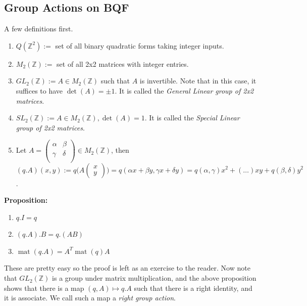 \documentclass[a4paper,11pt,abstracton]{scrartcl}
\theoremstyle{dotlessP}
\theoremstyle{dotlessS}
\theoremstyle{remark}
\theoremstyle{definition}
\begin{document}
\subsection{Group Actions on BQF}
A few definitions first.
\begin{definition_box}
\begin{enumerate}
\item $Q(\mathbb{Z}^2) := $ set of all binary quadratic forms taking integer inputs.
\item  $M_2(\mathbb{Z}) := $ set of all 2x2 matrices with integer entries.
\item $GL_2(\mathbb{Z}) := A \in M_2(\mathbb{Z})$ such that $A$ is invertible. Note that in this case, it suffices to have $\operatorname{det}(A) = \pm 1$. It is called the \emph{General Linear group of 2x2 matrices}.
\item $SL_2(\mathbb{Z}) := A \in M_2(\mathbb{Z}), \operatorname{det}(A)= 1$. It is called the \emph{Special Linear group of 2x2 matrices}.
\item Let $A = \begin{pmatrix}
\alpha &\beta \\
\gamma &\delta \\
\end{pmatrix} \in M_2(\mathbb{Z})$, then $(q.A)(x,y) := q\bigg(A \begin{pmatrix}
x \\ y
\end{pmatrix}\bigg)=q(\alpha x+\beta y,\gamma x + \delta y) = q(\alpha,\gamma)x^2 + (\dots)xy + q(\beta,\delta)y^2$.
\end{enumerate}
\end{definition_box}

\begin{problem_box}
\textbf{Proposition:}
\begin{enumerate}
\item $q.I = q$
\item $(q.A).B = q.(AB)$
\item $\operatorname{mat}(q.A)=A^T\operatorname{mat}(q)A$
\end{enumerate}
\end{problem_box}
These are pretty easy so the proof is left as an exercise to the reader. Now note that $GL_2(\mathbb{Z})$ is a group under matrix multiplication, and the above proposition shows that there is a map $(q,A) \mapsto q.A$ such that there is a right identity, and it is associate. We call such a map a \emph{right group action}.
\end{document}

